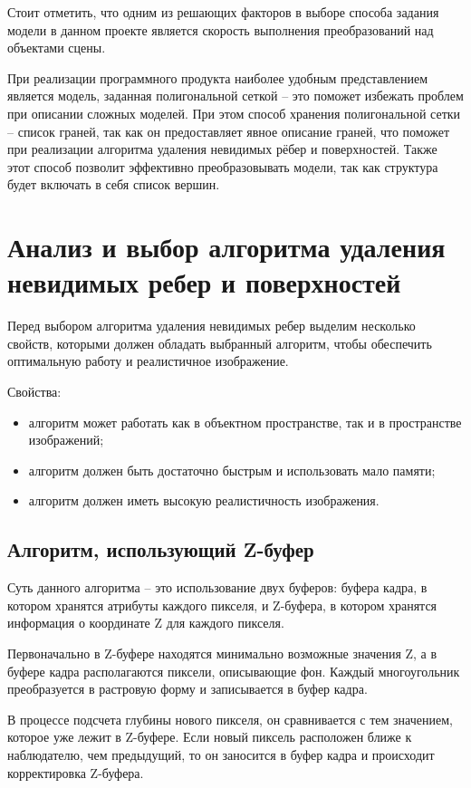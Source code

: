Стоит отметить, что одним из решающих факторов в выборе способа задания модели в данном проекте является скорость выполнения преобразований над объектами сцены.

При реализации программного продукта наиболее удобным представлением является модель, заданная полигональной сеткой – это поможет избежать проблем при описании сложных моделей. При этом способ хранения полигональной сетки – список граней, так как он предоставляет явное описание граней, что поможет при реализации алгоритма удаления невидимых рёбер и поверхностей. Также этот способ позволит эффективно преобразовывать модели, так как структура будет включать в себя список вершин. 

\section{Анализ и выбор алгоритма удаления невидимых ребер и поверхностей}

Перед выбором алгоритма удаления невидимых ребер выделим несколько свойств, которыми должен обладать выбранный алгоритм, чтобы обеспечить оптимальную работу и реалистичное изображение.

Свойства:	
\begin{itemize}
\item	алгоритм может работать как в объектном пространстве, так и в пространстве изображений;
\item	алгоритм должен быть достаточно быстрым и использовать мало памяти;
\item	алгоритм должен иметь высокую реалистичность изображения.
\end{itemize}

\subsection*{Алгоритм, использующий Z-буфер}
Суть данного алгоритма – это использование двух буферов: буфера кадра, в котором хранятся атрибуты каждого пикселя, и Z-буфера, в котором хранятся информация о координате Z для каждого пикселя.

Первоначально в Z-буфере находятся минимально возможные значения Z, а в буфере кадра располагаются пиксели, описывающие фон. Каждый многоугольник преобразуется в растровую форму и записывается в буфер кадра.

В процессе подсчета глубины нового пикселя, он сравнивается с тем значением, которое уже лежит в Z-буфере. Если новый пиксель расположен ближе к наблюдателю, чем предыдущий, то он заносится в буфер кадра и происходит корректировка Z-буфера.

